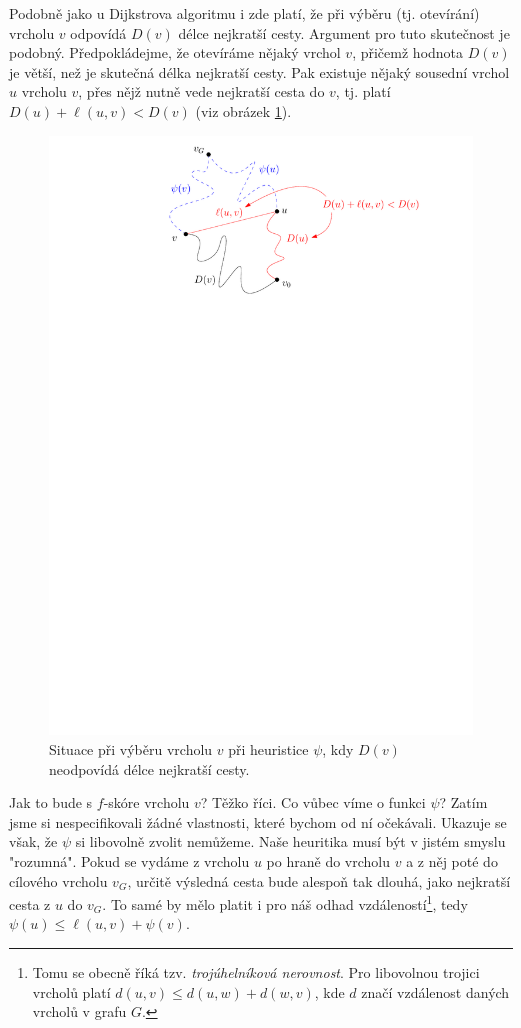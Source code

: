 Podobně jako u Dijkstrova algoritmu i zde platí, že při výběru (tj. otevírání) vrcholu $v$ odpovídá $D(v)$ délce nejkratší cesty. Argument pro tuto skutečnost je podobný. Předpokládejme, že otevíráme nějaký vrchol $v$, přičemž hodnota $D(v)$ je větší, než je skutečná délka nejkratší cesty. Pak existuje nějaký sousední vrchol $u$ vrcholu $v$, přes nějž nutně vede nejkratší cesta do $v$, tj. platí $D(u)+\ell(u,v)<D(v)$ (viz obrázek \ref{fig:astar_kratsi_cesta}).
\begin{figure}[h]
    \centering
    \includegraphics[scale=\graphimgsize]{components/images/ch01_astar_kratsi_cesta.pdf}
    \caption{Situace při výběru vrcholu $v$ při heuristice $\psi$, kdy $D(v)$ neodpovídá délce nejkratší cesty.}
    \label{fig:astar_kratsi_cesta}
\end{figure}
Jak to bude s $f$-skóre vrcholu $v$? Těžko říci. Co vůbec víme o funkci $\psi$? Zatím jsme si nespecifikovali žádné vlastnosti, které bychom od ní očekávali. Ukazuje se však, že $\psi$ si libovolně zvolit nemůžeme. Naše heuritika musí být v jistém smyslu "rozumná". Pokud se vydáme z vrcholu $u$ po hraně do vrcholu $v$ a z něj poté do cílového vrcholu $v_G$, určitě výsledná cesta bude alespoň tak dlouhá, jako nejkratší cesta z $u$ do $v_G$. To samé by mělo platit i pro náš odhad vzdáleností\footnote{Tomu se obecně říká tzv. \emph{trojúhelníková nerovnost}. Pro libovolnou trojici vrcholů platí $d(u,v)\leqslant d(u,w)+d(w,v)$, kde $d$ značí vzdálenost daných vrcholů v grafu $G$.}, tedy $\psi(u)\leqslant\ell(u,v)+\psi(v)$.


